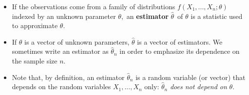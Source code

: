 \documentclass[notes=show]{beamer}
\begin{document}
\begin{frame}%


\begin{itemize}
\item If the observations come from a family of distributions $f\left(
X_{1},...,X_{n};\theta \right) $ indexed by an unknown parameter $\theta ,$
an \textbf{estimator} $\hat{\theta}$\ of $\theta $ is a statistic used to
approximate $\theta $.

\item If $\theta $ is a vector of unknown parameters, $\hat{\theta}$ is a
vector of estimators. We sometimes write an estimator as $\hat{\theta}_{n}$
in order to emphasize its dependence on the sample size $n$.

\item Note that, by definition, an estimator $\hat{\theta}_{n}$ is a random
variable (or vector) that depends on the random variables $X_{1},...,X_{n}$
only: $\hat{\theta}_{n}$ \textit{does not depend on} $\theta $.
\end{itemize}

\end{frame}%
\end{document}
